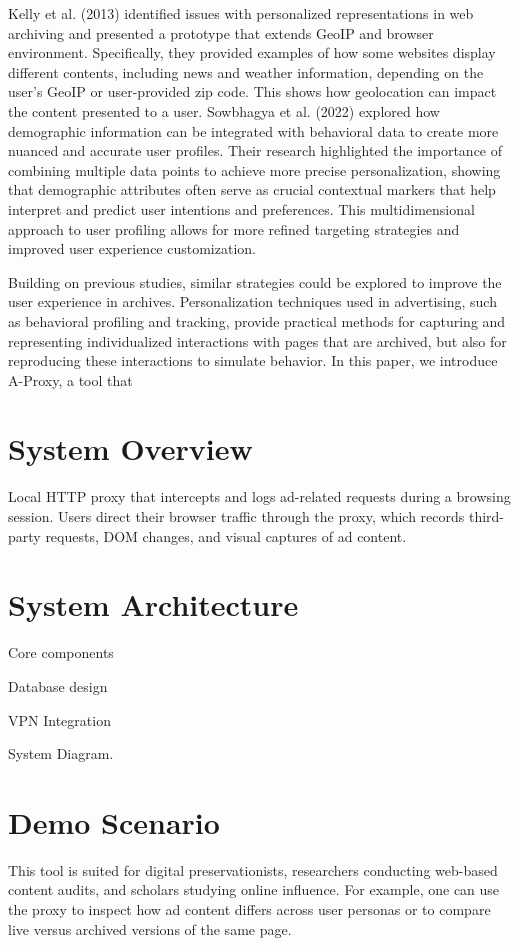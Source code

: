 \documentclass[sigconf]{acmart}
\begin{document}
Kelly et al. (2013) \cite{kelly2013method} identified issues with personalized representations in web archiving and presented a prototype that extends GeoIP and browser environment. Specifically, they provided examples of how some websites display different contents, including news and weather information, depending on the user’s GeoIP or user-provided zip code. This shows how geolocation can impact the content presented to a user. Sowbhagya et al. (2022) \cite{hidri2024learning} explored how demographic information can be integrated with behavioral data to create more nuanced and accurate user profiles. Their research highlighted the importance of combining multiple data points to achieve more precise personalization, showing that demographic attributes often serve as crucial contextual markers that help interpret and predict user intentions and preferences. This multidimensional approach to user profiling allows for more refined targeting strategies and improved user experience customization.

Building on previous studies, similar strategies could be explored to improve the user experience in archives. Personalization techniques used in advertising, such as behavioral profiling and tracking, provide practical methods for capturing and representing individualized interactions with pages that are archived, but also for reproducing these interactions to simulate behavior. In this paper, we introduce A-Proxy, a tool that 



\section{System Overview}
Local HTTP proxy that intercepts and logs ad-related requests during a browsing session. Users direct their browser traffic through the proxy, which records third-party requests, DOM changes, and visual captures of ad content.

\section{System Architecture}
Core components

Database design

VPN Integration

System Diagram.

\section{Demo Scenario}
This tool is suited for digital preservationists, researchers conducting web-based content audits, and scholars studying online influence. For example, one can use the proxy to inspect how ad content differs across user personas or to compare live versus archived versions of the same page.
\end{document}

